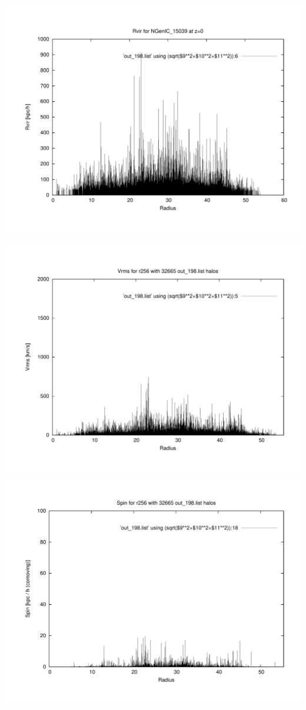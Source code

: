 \includegraphics[scale=0.3]{r256/h100/NGenIC_15039/plot_rvir_z0.pdf}

\includegraphics[scale=0.3]{r256/h100/NGenIC_15039/plot_Vrms_out_198.pdf}
\includegraphics[scale=0.3]{r256/h100/NGenIC_15039/plot_spin_out_198.pdf}
% 
%
%
%
%
%
%
%


